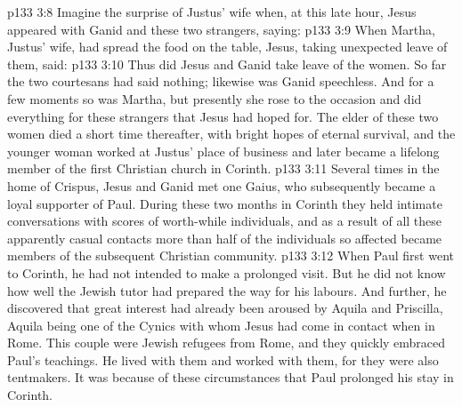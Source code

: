 \vs p133 3:8 Imagine the surprise of Justus’ wife when, at this late hour, Jesus appeared with Ganid and these two strangers, saying: 
\vs p133 3:9 When Martha, Justus’ wife, had spread the food on the table, Jesus, taking unexpected leave of them, said: 
\vs p133 3:10 Thus did Jesus and Ganid take leave of the women. So far the two courtesans had said nothing; likewise was Ganid speechless. And for a few moments so was Martha, but presently she rose to the occasion and did everything for these strangers that Jesus had hoped for. The elder of these two women died a short time thereafter, with bright hopes of eternal survival, and the younger woman worked at Justus’ place of business and later became a lifelong member of the first Christian church in Corinth.
\vs p133 3:11 Several times in the home of Crispus, Jesus and Ganid met one Gaius, who subsequently became a loyal supporter of Paul. During these two months in Corinth they held intimate conversations with scores of worth\hyp{}while individuals, and as a result of all these apparently casual contacts more than half of the individuals so affected became members of the subsequent Christian community.
\vs p133 3:12 When Paul first went to Corinth, he had not intended to make a prolonged visit. But he did not know how well the Jewish tutor had prepared the way for his labours. And further, he discovered that great interest had already been aroused by Aquila and Priscilla, Aquila being one of the Cynics with whom Jesus had come in contact when in Rome. This couple were Jewish refugees from Rome, and they quickly embraced Paul’s teachings. He lived with them and worked with them, for they were also tentmakers. It was because of these circumstances that Paul prolonged his stay in Corinth.
